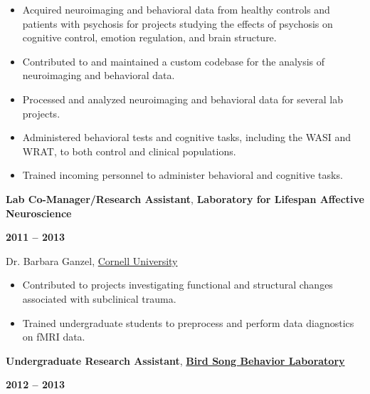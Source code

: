 \documentclass[10pt]{article}
\begin{document}
\begin{itemize}[noitemsep, nolistsep]
\item
  Acquired neuroimaging and behavioral data from healthy controls and
  patients with psychosis for projects studying the effects of psychosis
  on cognitive control, emotion regulation, and brain structure.
\item
  Contributed to and maintained a custom codebase for the analysis of
  neuroimaging and behavioral data.
\item
  Processed and analyzed neuroimaging and behavioral data for several
  lab projects.
\item
  Administered behavioral tests and cognitive tasks, including the WASI
  and WRAT, to both control and clinical populations.
\item
  Trained incoming personnel to administer behavioral and cognitive
  tasks.
\end{itemize}

\newpage

\begin{minipage}[t]{.85\linewidth}
	\flushleft
	\noindent
	\textbf{Lab Co-Manager/Research Assistant},
	\textbf{Laboratory for Lifespan Affective Neuroscience}
	\end{minipage}
	\hfill
	\begin{minipage}[t]{.15\linewidth}
	\flushright
	\noindent
	\textsc{\textbf{2011 -- 2013}}
\end{minipage}

Dr. Barbara Ganzel,
\href{http://www.cornell.edu}{Cornell University}

\begin{itemize}[noitemsep, nolistsep]
\item
  Contributed to projects investigating functional and structural
  changes associated with subclinical trauma.
\item
  Trained undergraduate students to preprocess and perform data
  diagnostics on fMRI data.
\end{itemize}

\bigskip

\begin{minipage}[t]{.85\linewidth}
	\flushleft
	\noindent
	\textbf{Undergraduate Research Assistant},
	\href{http://people.psych.cornell.edu/~devoogdlab/}{\textbf{Bird Song Behavior Laboratory}}
	\end{minipage}
	\hfill
	\begin{minipage}[t]{.15\linewidth}
	\flushright
	\noindent
	\textsc{\textbf{2012 -- 2013}}
\end{minipage}
\end{document}
